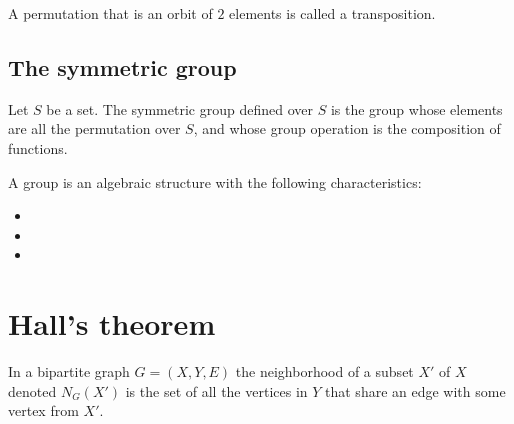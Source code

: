 \documentclass[11pt,a4paper]{article}
\begin{document}
  \begin{definition}[Transposition]
		A permutation that is an orbit of $2$ elements is called a transposition.
  \end{definition}
	
	\subsection{The symmetric group}
  \begin{definition}
    Let $S$ be a set.
    The symmetric group defined over $S$ is the group whose elements are
    all the permutation over $S$, and whose group operation is the
    composition of functions.
  \end{definition}

	\begin{remark}
	A group is an algebraic structure with the following 
	characteristics:
	\begin{itemize}
		\item {}
		\item {}
		\item {}
	\end{itemize}
	\end{remark}
		
	\newpage
	\section{Hall's theorem}
  \begin{definition}[Neighborhood]
		In a bipartite graph $G=(X,Y,E)$ the neighborhood of a subset
		$X'$ of $X$ denoted $N_G(X')$ is the set of all the vertices in 
		$Y$ that share an edge with some vertex from $X'$.
	\end{definition}
\end{document}
